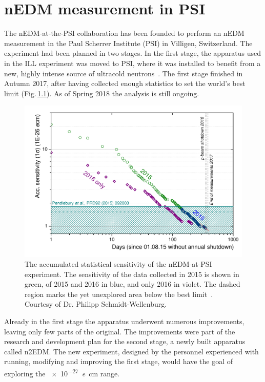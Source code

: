 \chapter{nEDM measurement in PSI}
\label{ch:nedm-at-psi-apparatus}

The nEDM-at-the-PSI collaboration has been founded to perform an nEDM measurement in the Paul Scherrer Institute (PSI) in Villigen, Switzerland. The experiment had been planned in two stages. In the first stage, the apparatus used in the ILL experiment was moved to PSI, where it was installed to benefit from a new, highly intense source of ultracold neutrons~\cite{Lauss2014}. The first stage finished in Autumn 2017, after having collected enough statistics to set the world's best limit (Fig.\,\ref{fig:nEDM_accumulated_sensitivity}). As of Spring 2018 the analysis is still ongoing.

\begin{figure}
  \centering
  \includegraphics[width=0.8\linewidth]{gfx/nEDMatPSI/accumulated_sensitivity.pdf}
  \caption{The accumulated statistical sensitivity of the nEDM-at-PSI experiment. The sensitivity of the data collected in 2015 is shown in green, of 2015 and 2016 in blue, and only 2016 in violet. The dashed region marks the yet unexplored area below the best limit~\cite{Pendlebury2015}. Courtesy of Dr. Philipp Schmidt-Wellenburg.}
  \label{fig:nEDM_accumulated_sensitivity}
\end{figure}

Already in the first stage the apparatus underwent numerous improvements, leaving only few parts of the original. The improvements were part of the research and development plan for the second stage, a newly built apparatus called n2EDM. The new experiment, designed by the personnel experienced with running, modifying and improving the first stage, would have the goal of exploring the \SI{e-27}{\elementarycharge\centi\meter} range.


